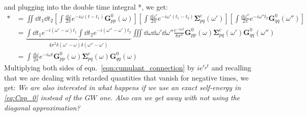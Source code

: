and plugging into the double time integral *, we get:
\begin{align}
    * &= \iint \dd t_1 \dd t_2 \left[\int \frac{\dd \omega}{2\pi} e^{-i\omega (t-t_1)} \bm{G}_{pp}^{0}(\omega)\right] \left[\int \frac{\dd \omega'}{2\pi} e^{-i\omega' (t_1 - t_2)} \bm{\Sigma}_{pq}^c(\omega')\right] \left[\int \frac{\dd \omega''}{2\pi} e^{-i\omega'' t_2} \bm{G}_{qq}^{0}(\omega'')\right]\\
    &= \underbrace{\int \dd t_1 e^{-i \left(\omega' -\omega\right)t_1} \int \dd t_2 e^{-i \left(\omega'' -\omega'\right)t_2}}_{4\pi^2 \delta(\omega' -\omega)\delta(\omega'' -\omega')} \iiint \dd \omega \dd \omega' \dd \omega'' \frac{e^{-i\omega t}}{8\pi^3} \bm{G}_{pp}^{0}(\omega)\bm{\Sigma}_{pq}^c(\omega')\bm{G}_{qq}^{0}(\omega'')\\
    &= \int \frac{\dd \omega}{2\pi} e^{-i\omega t} \bm{G}_{pp}^{0}(\omega)\bm{\Sigma}_{pq}^c(\omega)\bm{G}_{qq}^{0}(\omega)
\end{align}
Multiplying both sides of eqn.~\ref{eqn:cumulant_connection} by $ie^{\epsilon_p t} $ and recalling that we are dealing with retarded quantities that vanish for negative times, we get:
\emph{We are also interested in what happens if we use an exact self-energy in \ref{eq:Cpp_0} instead of the $GW$ one. Also can we get away with not using the diagonal approximation?} 
